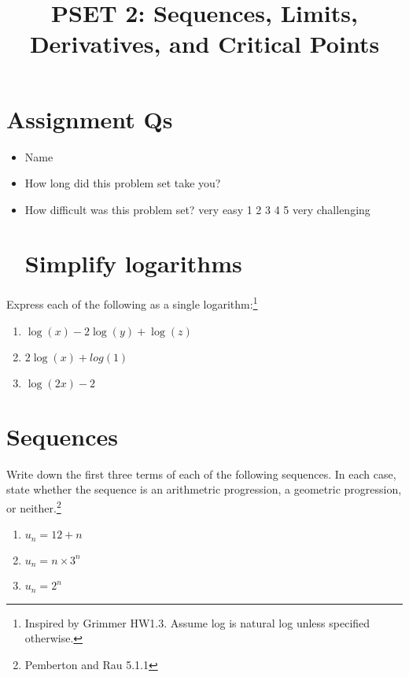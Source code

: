 \documentclass[
  letterpaper,
  DIV=11,
  numbers=noendperiod]{scrartcl}
\title{PSET 2: Sequences, Limits, Derivatives, and Critical Points}
\author{}
\date{}
\begin{document}
\maketitle
\ifdefined\Shaded\renewenvironment{Shaded}{\begin{tcolorbox}[frame hidden, interior hidden, breakable, sharp corners, boxrule=0pt, borderline west={3pt}{0pt}{shadecolor}, enhanced]}{\end{tcolorbox}}\fi

\hypertarget{assignment-qs}{%
\section{Assignment Qs}\label{assignment-qs}}

\begin{itemize}
\item
  Name
\item
  How long did this problem set take you?
\item
  How difficult was this problem set? very easy 1 2 3 4 5 very
  challenging

  \hypertarget{simplify-logarithms}{%
  \section{Simplify logarithms}\label{simplify-logarithms}}
\end{itemize}

Express each of the following as a single logarithm:\footnote{Inspired
  by Grimmer HW1.3. Assume log is natural log unless specified
  otherwise.}

\begin{enumerate}
\def\labelenumi{\alph{enumi}.}
\item
  \(\log(x) - 2\log(y) + \log(z)\)
\item
  \(2 \log(x) + log(1)\)
\item
  \(\log(2x) - 2\)
\end{enumerate}

\hypertarget{sequences}{%
\section{Sequences}\label{sequences}}

Write down the first three terms of each of the following sequences. In
each case, state whether the sequence is an arithmetric progression, a
geometric progression, or neither.\footnote{Pemberton and Rau 5.1.1}

\begin{enumerate}
\def\labelenumi{\alph{enumi}.}
\item
  \(u_n = 12 + n\)
\item
  \(u_n = n \times 3^n\)
\item
  \(u_n = 2^n\)
\end{enumerate}
\end{document}
